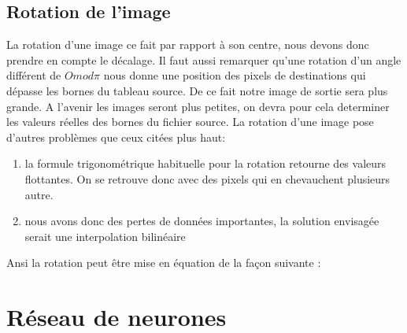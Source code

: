 \documentclass[]{report}
\begin{document}
        \section{Rotation de l'image}
        \label{principe}
        La rotation d'une image ce fait par rapport à son centre, nous devons donc prendre en compte le décalage.
        Il faut aussi remarquer qu'une rotation d'un angle différent de $O mod \pi$ nous donne une position des
        pixels de destinations qui dépasse les bornes du tableau source. De ce fait notre image
        de sortie sera plus grande. A l'avenir les images seront plus petites, on devra pour cela determiner les valeurs réelles
        des bornes du fichier source.
        La rotation d'une image pose d'autres problèmes que ceux citées plus haut:
        \begin{enumerate}
          \item la formule trigonométrique habituelle pour la rotation retourne des valeurs flottantes. On se retrouve donc avec des pixels qui en chevauchent plusieurs autre.
          \item nous avons donc des pertes de données importantes, la solution envisagée serait une interpolation bilinéaire
        \end{enumerate}
        Ansi la rotation peut être mise en équation de la façon suivante :



	\chapter{R\'eseau de neurones} %
	\label{cha:r'eseau_de_neurones}

\end{document}
